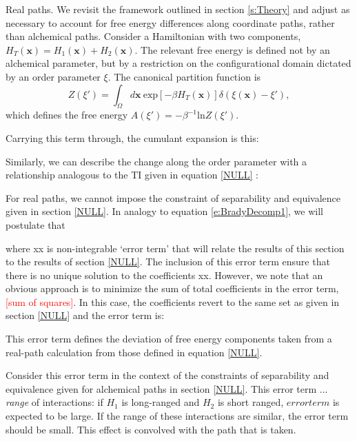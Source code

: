 \documentclass[%
 preprint,
 amsmath,amssymb,
 aps,
]{revtex4-1}
\newcommand{\warning}[1]{{\textsf{{\textcolor{red}{{[#1]}{}}}}}}
\renewcommand{\vec}[1]{{\bm{#1}}}
\begin{document}
 
 Real paths. We revisit the framework outlined in section \ref{s:Theory} and adjust as necessary to account for free energy differences along coordinate paths, rather than alchemical paths. Consider a Hamiltonian with two components, 
 $H_{T} \left( \vec{x} \right) = H_1 \left( \vec{x} \right) + H_2 \left( \vec{x} \right)$.  The relevant free energy is defined not by an alchemical parameter, but by a restriction on the configurational domain dictated by an order parameter $\xi$.  The canonical partition function is
 \begin{equation}
 Z \left( \xi' \right) = \int_{\Omega} d \vec{x}  \:  \mbox{exp} 
 \left[ -\beta H_T \left(\vec{x} \right) \right] 
 \delta \left( \xi \left( \vec{x} \right) - \xi'\right),
 \label{e:RealZ}
 \end{equation}
 which defines the free energy $A \left( \xi'\right) = -\beta^{-1} \mbox{ln} Z \left( \xi' \right)$. 
 
 Carrying this term through, the cumulant expansion is this:
 
 Similarly, we can describe the change along the order parameter with a relationship analogous to
 the TI given in equation \ref{NULL} \cite{NULL}: 
 
For real paths, we cannot impose the constraint of separability and equivalence given in section \ref{NULL}.  In analogy
to equation \ref{e:BradyDecomp1}, we will postulate that

where xx is non-integrable `error term' that will relate the
results of this section to the results of section \ref{NULL}.  The inclusion of this error term ensure that there is no 
unique solution to the coefficients xx.  However, we note that an obvious approach is to minimize the sum of total coefficients in the error term, \warning{sum of squares}.  In this case, the coefficients revert to the same set as given in section \ref{NULL} and the error term is:

This error term defines the deviation of free energy components taken from a real-path calculation from those defined in equation \ref{NULL}.  
 
 Consider this error term in the context of the constraints of separability and equivalence given for alchemical paths in section \ref{NULL}.  This error term ... \textit{range} of interactions:  if $H_1$ is long-ranged and $H_2$ is short ranged, $error term$ is expected to be large.  If the range of these interactions are similar, the error term should be small.  This 
 effect is convolved with the path that is taken. 
 
\end{document}
